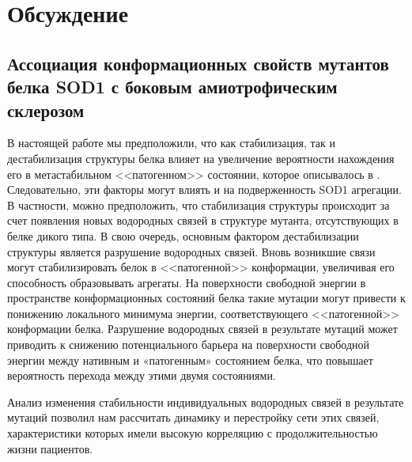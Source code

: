 \chapter{Обсуждение} \label{chapt4}

\section{Ассоциация конформационных свойств мутантов белка SOD1 с боковым амиотрофическим склерозом} \label{sect_SOD1_mutations}

В настоящей работе мы предположили, что как стабилизация, так и дестабилизация структуры белка влияет на увеличение вероятности нахождения его в метастабильном <<патогенном>> состоянии, которое описывалось в \cite{Ross2004}. Следовательно, эти факторы могут влиять и на подверженность SOD1 агрегации. В частности, можно предположить, что стабилизация структуры происходит за счет появления новых водородных связей в структуре мутанта, отсутствующих в белке дикого типа. В свою очередь, основным фактором дестабилизации структуры является разрушение водородных связей. Вновь возникшие связи могут стабилизировать белок в <<патогенной>> конформации, увеличивая его способность образовывать агрегаты. На поверхности свободной энергии в пространстве конформационных состояний белка такие мутации могут привести к понижению локального минимума энергии, соответствующего <<патогенной>> конформации белка. Разрушение водородных связей в результате мутаций может приводить к снижению потенциального барьера на поверхности свободной энергии между нативным и «патогенным» состоянием белка, что повышает вероятность перехода между этими двумя состояниями.

Анализ изменения стабильности индивидуальных водородных связей в результате мутаций позволил нам рассчитать динамику и перестройку сети этих связей, характеристики которых имели высокую корреляцию с продолжительностью жизни пациентов. 

